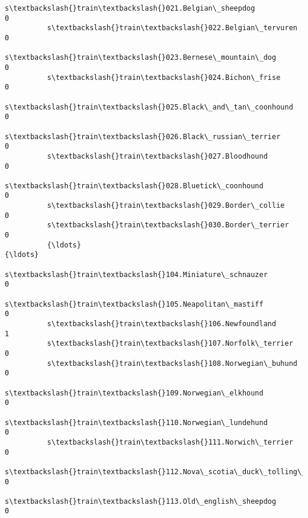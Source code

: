 \documentclass[11pt]{article}
\begin{document}
\begin{Verbatim}[commandchars=\\\{\}]
          s\textbackslash{}train\textbackslash{}021.Belgian\_sheepdog                                                     0   
          s\textbackslash{}train\textbackslash{}022.Belgian\_tervuren                                                     0   
          s\textbackslash{}train\textbackslash{}023.Bernese\_mountain\_dog                                                 0   
          s\textbackslash{}train\textbackslash{}024.Bichon\_frise                                                         0   
          s\textbackslash{}train\textbackslash{}025.Black\_and\_tan\_coonhound                                              0   
          s\textbackslash{}train\textbackslash{}026.Black\_russian\_terrier                                                0   
          s\textbackslash{}train\textbackslash{}027.Bloodhound                                                           0   
          s\textbackslash{}train\textbackslash{}028.Bluetick\_coonhound                                                   0   
          s\textbackslash{}train\textbackslash{}029.Border\_collie                                                        0   
          s\textbackslash{}train\textbackslash{}030.Border\_terrier                                                       0   
          {\ldots}                                                                            {\ldots}   
          s\textbackslash{}train\textbackslash{}104.Miniature\_schnauzer                                                  0   
          s\textbackslash{}train\textbackslash{}105.Neapolitan\_mastiff                                                   0   
          s\textbackslash{}train\textbackslash{}106.Newfoundland                                                         1   
          s\textbackslash{}train\textbackslash{}107.Norfolk\_terrier                                                      0   
          s\textbackslash{}train\textbackslash{}108.Norwegian\_buhund                                                     0   
          s\textbackslash{}train\textbackslash{}109.Norwegian\_elkhound                                                   0   
          s\textbackslash{}train\textbackslash{}110.Norwegian\_lundehund                                                  0   
          s\textbackslash{}train\textbackslash{}111.Norwich\_terrier                                                      0   
          s\textbackslash{}train\textbackslash{}112.Nova\_scotia\_duck\_tolling\_retriever                                   0   
          s\textbackslash{}train\textbackslash{}113.Old\_english\_sheepdog                                                 0   

\end{Verbatim}
\end{document}
